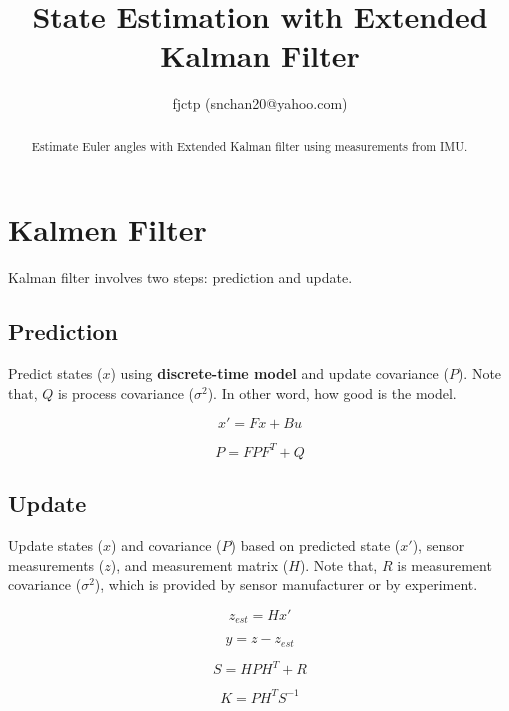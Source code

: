 \documentclass[]{article}
\title{State Estimation with Extended Kalman Filter}
\author{fjctp (snchan20@yahoo.com)}
\begin{document}
\maketitle

\begin{abstract}
Estimate Euler angles with Extended Kalman filter using measurements from IMU.
\end{abstract}

\section{Kalmen Filter}
Kalman filter involves two steps: prediction and update.

\subsection{Prediction}
Predict states ($x$) using \textbf{discrete-time model} and update covariance ($P$). Note that, $Q$ is process covariance ($\sigma^2$). In other word, how good is the model. 

\begin{equation}
x' = Fx + Bu\label{eqn:model}
\end{equation}


\begin{equation}
P = FPF^T + Q\label{eqn:predict_covarance}
\end{equation}

\subsection{Update}
Update states ($x$) and covariance ($P$) based on predicted state ($x'$), sensor measurements ($z$), and measurement matrix ($H$). Note that, $R$ is measurement covariance ($\sigma^2$), which is provided by sensor manufacturer or by experiment.

\begin{equation}
z_{est} = Hx'\label{eqn:predict_measurement}
\end{equation}

\begin{equation}
y = z - z_{est}\label{eqn:measurement_difference}
\end{equation}

\begin{equation}
S = HPH^T + R\label{eqn:innovation_covariance}
\end{equation}

\begin{equation}
K = PH^TS^{-1}\label{eqn:kalman_gain}
\end{equation}
\end{document}
